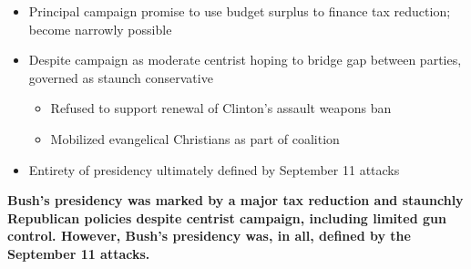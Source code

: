 \documentclass[a4paper]{article}
\begin{document}
        {
            \begin{itemize}
                \item Principal campaign promise to use budget surplus to finance tax reduction; become narrowly possible
                \item Despite campaign as moderate centrist hoping to bridge gap between parties, governed as staunch conservative
                \begin{itemize}
                    \item Refused to support renewal of Clinton's assault weapons ban
                    \item Mobilized evangelical Christians as part of coalition
                \end{itemize}
                \item Entirety of presidency ultimately defined by September 11 attacks
            \end{itemize}
            \textbf{Bush's presidency was marked by a major tax reduction and staunchly Republican policies despite centrist campaign, including limited gun control. However, Bush's presidency was, in all, defined by the September 11 attacks.}
        }
\end{document}
